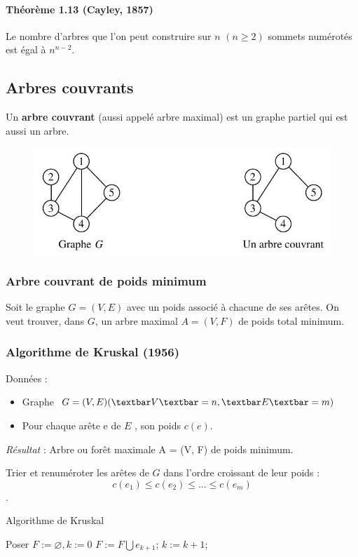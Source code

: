 \paragraph*{Théorème 1.13 (Cayley, 1857)}
Le nombre d'arbres que l'on peut construire sur $ n $ $ (n \geq 2) $ sommets numérotés est
égal à $ n^{n-2} $.

\subsection{Arbres couvrants}
Un \textbf{arbre couvrant} (aussi appelé arbre maximal) est un graphe partiel qui est aussi un
arbre.

\begin{figure}[h]
\centering
\includegraphics[width=0.7\linewidth]{images/graph16}
\end{figure}

\subsubsection{Arbre couvrant de poids minimum}
Soit le graphe $ G = (V, E) $ avec un poids associé à chacune de ses arêtes. On veut trouver,
dans $ G $, un arbre maximal $ A = (V, F) $ de poids total minimum.

\subsubsection*{Algorithme de Kruskal (1956)}
Données :
\begin{itemize}
	\item Graphe $ G = (V, E) (\textbar V \textbar = n, \textbar E \textbar = m) $
	\item Pour chaque arête e de $ E $ , son poids $ c(e) $.
\end{itemize}
\textit{Résultat} : Arbre ou forêt maximale A = (V, F) de poids minimum.

Trier et renuméroter les arêtes de $ G $ dans l'ordre croissant de leur poids :
$$ c(e_{1} ) \leq c(e_{2} ) \leq \dots \leq c(e_{m}) $$.


\begin{algorithm}
	\caption{Algorithme de Kruskal}\label{euclid}
	\begin{algorithmic}[1]
		\Procedure{}{}
		\State Poser $ F := \varnothing, k := 0 $
		\State$ F := F \bigcup {e_{k+1} } $;
		\EndIf 
		\State $k := k + 1 $;
		\EndWhile
		\EndProcedure
	\end{algorithmic}
\end{algorithm}

